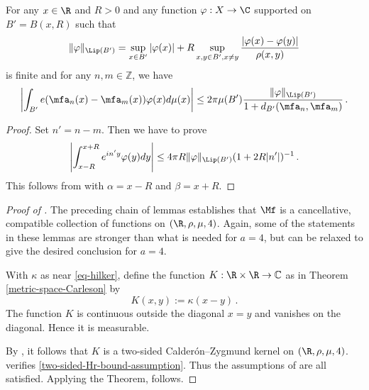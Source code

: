 \begin{lemma}
\label{real-van-der-Corput}
\leanok
{}
    For any $x\in \R$ and $R>0$ and any
    function $\varphi: X\to \C$ supported on $B'=B(x,R)$
    such that
\begin{equation}
    \|\varphi\|_{\Lip(B')} = \sup_{x \in B'} |\varphi(x)| + R \sup_{x,y \in B', x \neq y} \frac{|\varphi(x) - \varphi(y)|}{\rho(x,y)}
\end{equation}
is finite and for any $n,m\in \mathbb{Z}$, we have
\begin{equation}
    \label{eq-vdc-cond1}
    \left|\int_{B'} e(\mfa_n(x)-{\mfa_m(x)}) \varphi(x) d\mu(x)\right|\le 2\pi \mu(B')\frac{\|\varphi\|_{\Lip(B')}}{1+d_{B'}(\mfa_n,\mfa_m)}
\, .
\end{equation}
\end{lemma}
\begin{proof}
    \leanok
Set $n'=n-m$. Then we have to prove
\begin{equation}
    \label{eq-vdc-cond2}
    \left|\int_{x-R}^{x+R} e^{in'y}\varphi(y) dy\right|\le 4\pi R\|\varphi\|_{\Lip(B')}
(1+2R|n'|)^{-1}\, .
\end{equation}
This follows from  with $\alpha = x - R$ and $\beta = x + R$.
\end{proof}

\begin{proof}[Proof of ]
\leanok

The preceding chain of lemmas establishes that $\Mf$ is a cancellative, compatible collection of functions on $(\R, \rho, \mu, 4)$. Again, some of the statements in these lemmas are stronger than what is needed for $a=4$, but can be relaxed to give the desired conclusion for $a=4$.

With $\kappa$ as near \eqref{eq-hilker}, define
the function $K:\R\times \R\to \mathbb{C}$ as in Theorem
\ref{metric-space-Carleson} by
\begin{equation}
    K(x,y):=\kappa(x-y)\, .
\end{equation}
The function $K$ is continuous outside the diagonal
$x=y$ and vanishes on the diagonal. Hence it is measurable.


By , it follows that $K$ is a two-sided Calder\'on--Zygmund kernel on $(\R,\rho,\mu,4)$.
 verifies \eqref{two-sided-Hr-bound-assumption}.
Thus the assumptions of  are all satisfied. Applying the Theorem,  follows.

\end{proof}


\printbibliography
